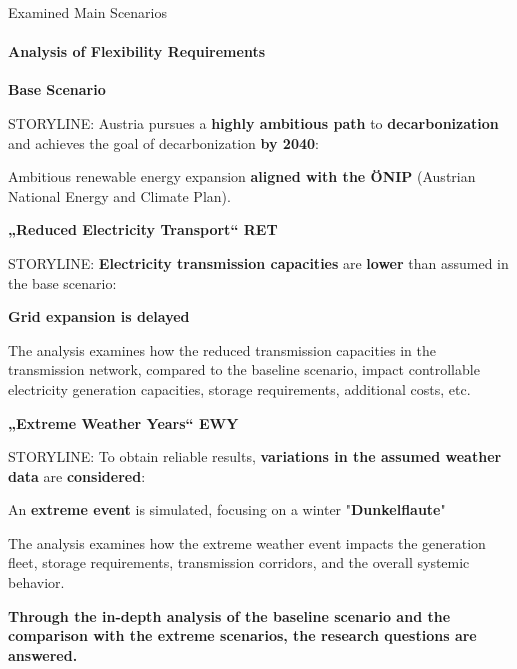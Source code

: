 \documentclass[aspectratio=169]{beamer}
\begin{document}
\begin{frame}{Examined Main Scenarios}
    \framesubtitle{Analysis of Flexibility Requirements}

    \begin{tugitemize}
        \item \small\textbf{Base Scenario}
        \vspace{-0.3cm}
        \begin{tugitemize}
            \item \footnotesize STORYLINE: Austria pursues a \textbf{highly ambitious path} to \textbf{decarbonization} and achieves the goal of decarbonization \textbf{by 2040}:
            \begin{tugitemize}
                \item \scriptsize Ambitious renewable energy expansion \textbf{aligned with the ÖNIP} (Austrian National Energy and Climate Plan).
            \end{tugitemize}
        \end{tugitemize}
        \item \small\textbf{„Reduced Electricity Transport“ RET}
        \vspace{-0.3cm}
        \begin{tugitemize}
            \item \footnotesize STORYLINE: \textbf{Electricity transmission capacities} are \textbf{lower} than assumed in the base scenario:
            \begin{tugitemize}
                \item \scriptsize\textbf{Grid expansion is delayed}
            \end{tugitemize}
            \item \footnotesize The analysis examines how the reduced transmission capacities in the transmission network, compared to the baseline scenario, impact controllable electricity generation capacities, storage requirements, additional costs, etc.
        \end{tugitemize}
        \item \small\textbf{„Extreme Weather Years“ EWY}
        \vspace{-0.3cm}
        \begin{tugitemize}
            \item \footnotesize STORYLINE: To obtain reliable results, \textbf{variations in the assumed weather data} are \textbf{considered}:
            \begin{tugitemize}
                \item \scriptsize An \textbf{extreme event} is simulated, focusing on a winter "\textbf{Dunkelflaute}"
            \end{tugitemize}
            \item \footnotesize The analysis examines how the extreme weather event impacts the generation fleet, storage requirements, transmission corridors, and the overall systemic behavior.
        \end{tugitemize}
        \centering
        \textbf{Through the in-depth analysis of the baseline scenario  and the comparison with the extreme scenarios, the research questions are answered.}
    \end{tugitemize}
    

\end{frame}
\end{document}
